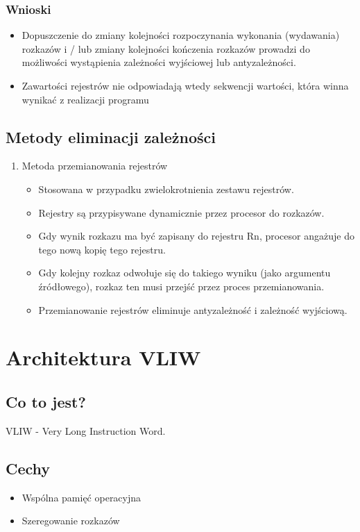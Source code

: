         \subsubsection*{Wnioski}
	        \begin{itemize}
	           	\item Dopuszczenie do zmiany kolejności rozpoczynania wykonania (wydawania) rozkazów i / lub zmiany kolejności kończenia rozkazów prowadzi do możliwości wystąpienia zależności wyjściowej lub antyzależności.
	           	\item Zawartości rejestrów nie odpowiadają wtedy sekwencji wartości, która winna wynikać z realizacji programu
	        \end{itemize}
        
	\subsection{Metody eliminacji zależności}
		\begin{enumerate}
			\item Metoda przemianowania rejestrów
			\begin{itemize}
				\item Stosowana w przypadku zwielokrotnienia zestawu rejestrów.
				\item Rejestry są przypisywane dynamicznie przez procesor do rozkazów.
				\item Gdy wynik rozkazu ma być zapisany do rejestru Rn, procesor angażuje do tego nową kopię tego rejestru.
				\item Gdy kolejny rozkaz odwołuje się do takiego wyniku (jako argumentu źródłowego), rozkaz ten musi przejść przez proces przemianowania.
				\item Przemianowanie rejestrów eliminuje antyzależność i zależność wyjściową.
			\end{itemize}
		\end{enumerate}
		
\section{Architektura VLIW}
	\subsection{Co to jest?}
		VLIW - Very Long Instruction Word.
	\subsection{Cechy}
		\begin{itemize}
			\item Wspólna pamięć operacyjna
			\item Szeregowanie rozkazów
		\end{itemize}
